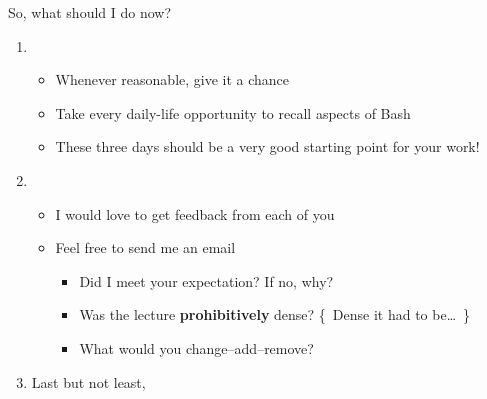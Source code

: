 \begin{frame}{So, what should I do now?}
    \vspace{-2mm}
    \begin{enumerate}
        \setlength{\itemsep}{1mm}
        \item<1-> 
                  \begin{itemize}
                    \item Whenever reasonable, give it a chance
                    \item Take every daily-life opportunity to recall aspects of Bash
                    \item These three days should be a very good starting point for your work!
                  \end{itemize}
        \item<2-> 
                  \begin{itemize}
                      \item I would love to get feedback from each of you
                      \item Feel free to send me an email \,
                            \begin{itemize}
                                \item Did I meet your expectation? If no, why?
                                \item Was the lecture \textbf{prohibitively} dense? {\tiny\{~Dense it had to be\ldots~\}}
                                \item What would you change--add--remove?
                            \end{itemize}
                  \end{itemize}
        \item<3-> Last but not least,  $\;$
    \end{enumerate}
\end{frame}